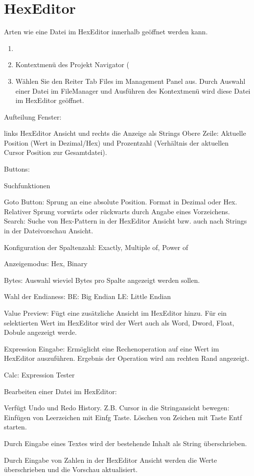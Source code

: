 \section{HexEditor}\label{sec:hexeditor}

Arten wie eine Datei im HexEditor innerhalb \codeblocks geöffnet werden kann.

\begin{enumerate}
\item {}
\item Kontextmenü des Projekt Navigator (
\item Wählen Sie den Reiter Tab Files im Management Panel aus. Durch Auswahl einer Datei im FileManager und Ausführen des Kontextmenü  wird diese Datei im HexEditor geöffnet.
\end{enumerate}

Aufteilung Fenster:

links HexEditor Ansicht und rechts die Anzeige als Strings
Obere Zeile:
Aktuelle Position (Wert in Dezimal/Hex) und Prozentzahl (Verhältnis der aktuellen Cursor Position zur Gesamtdatei).

Buttons:

Suchfunktionen

Goto Button: Sprung an eine absolute Position. Format in Dezimal oder Hex. Relativer Sprung vorwärts oder rückwarts durch Angabe eines Vorzeichens.
Search: Suche von Hex-Pattern in der HexEditor Ansicht bzw. auch nach Strings in der Dateivorschau Ansicht.

Konfiguration der Spaltenzahl:
Exactly, Multiple of, Power of

Anzeigemodus:
Hex, Binary

Bytes:
Auswahl wieviel Bytes pro Spalte angezeigt werden sollen.

Wahl der Endianess:
BE: Big Endian
LE: Little Endian

Value Preview:
Fügt eine zusätzliche Ansicht im HexEditor hinzu. Für ein selektierten Wert im HexEditor wird der Wert auch als Word, Dword, Float, Dobule angezeigt werde.

Expression Eingabe:
Ermöglicht eine Rechenoperation auf eine Wert im HexEditor auszuführen. Ergebnis der Operation wird am rechten Rand angezeigt.

Calc:
Expression Tester

Bearbeiten einer Datei im HexEditor:

Verfügt Undo und Redo History.
Z.B. Cursor in die Stringansicht bewegen:
Einfügen von Leerzeichen mit Einfg Taste.
Löschen von Zeichen mit Taste Entf starten.

Durch Eingabe eines Textes wird der bestehende Inhalt als String überschrieben.

Durch Eingabe von Zahlen in der HexEditor Ansicht werden die Werte überschrieben und die Vorschau aktualisiert.

